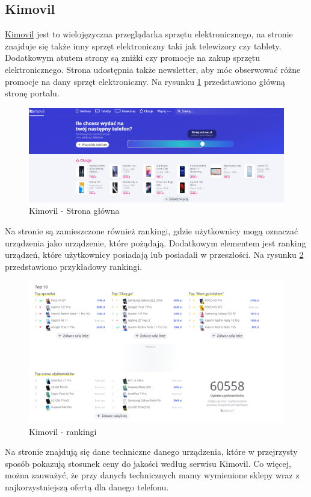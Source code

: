 \subsection{Kimovil}
\href{https://www.kimovil.com/pl/}{Kimovil} \cite{kimovil} jest to wielojęzyczna przeglądarka sprzętu elektronicznego, na stronie znajduje się także inny sprzęt elektroniczny taki jak telewizory czy tablety. Dodatkowym atutem strony są zniżki czy promocje na zakup sprzętu elektronicznego. Strona udostępnia także newsletter, aby móc obserwować różne promocje na dany sprzęt elektroniczny. Na rysunku \ref*{kimovil_1} przedstawiono główną stronę portalu.
\begin{figure}[H]
    \centering
    \includegraphics[scale=0.36]{img/Kimovil/kimovil.png}
    \caption{Kimovil - Strona główna}
    \label{kimovil_1}
\end{figure}
Na stronie są zamieszczone również rankingi, gdzie użytkownicy mogą oznaczać urządzenia jako urządzenie, które pożądają. Dodatkowym elementem jest ranking urządzeń, które użytkownicy posiadają lub posiadali w przeszłości. Na rysunku \ref*{kimovil_2} przedstawiono przykładowy rankingi.
\begin{figure}[H]
    \centering
    \includegraphics[scale=0.448]{img/Kimovil/rankingsKimovil.png}
    \caption{Kimovil - rankingi}
    \label{kimovil_2}
\end{figure}
Na stronie znajdują się dane techniczne danego urządzenia, które w przejrzysty sposób pokazują stosunek ceny do jakości według serwisu Kimovil. Co więcej, można zauważyć, że przy danych technicznych mamy wymienione sklepy wraz z najkorzystniejszą ofertą dla danego telefonu. 

